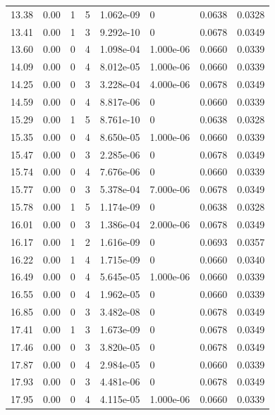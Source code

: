 \documentclass[preview]{standalone}
\begin{document}
{{{\begin{tabular}{L{1.2cm}C{1.2cm} C{0.3cm}C{0.5cm} C{1.4cm}C{1.4cm} C{1.4cm}C{1.4cm}}
  13.38  &  0.00  & 1     &  5 &  1.062e-09  & 0  & 0.0638 &  0.0328   \\ 
  13.41  &  0.00  & 1     &  3 &  9.292e-10  & 0  & 0.0678 &  0.0349   \\ 
  13.60  &  0.00  & 0     &  4 &  1.098e-04  & 1.000e-06  & 0.0660 &  0.0339   \\ 
  14.09  &  0.00  & 0     &  4 &  8.012e-05  & 1.000e-06  & 0.0660 &  0.0339   \\ 
  14.25  &  0.00  & 0     &  3 &  3.228e-04  & 4.000e-06  & 0.0678 &  0.0349   \\ 
  14.59  &  0.00  & 0     &  4 &  8.817e-06  & 0  & 0.0660 &  0.0339   \\ 
  15.29  &  0.00  & 1     &  5 &  8.761e-10  & 0  & 0.0638 &  0.0328   \\ 
  15.35  &  0.00  & 0     &  4 &  8.650e-05  & 1.000e-06  & 0.0660 &  0.0339   \\ 
  15.47  &  0.00  & 0     &  3 &  2.285e-06  & 0  & 0.0678 &  0.0349   \\ 
  15.74  &  0.00  & 0     &  4 &  7.676e-06  & 0  & 0.0660 &  0.0339   \\ 
  15.77  &  0.00  & 0     &  3 &  5.378e-04  & 7.000e-06  & 0.0678 &  0.0349   \\ 
  15.78  &  0.00  & 1     &  5 &  1.174e-09  & 0  & 0.0638 &  0.0328   \\ 
  16.01  &  0.00  & 0     &  3 &  1.386e-04  & 2.000e-06  & 0.0678 &  0.0349   \\ 
  16.17  &  0.00  & 1     &  2 &  1.616e-09  & 0  & 0.0693 &  0.0357   \\ 
  16.22  &  0.00  & 1     &  4 &  1.715e-09  & 0  & 0.0660 &  0.0340   \\ 
  16.49  &  0.00  & 0     &  4 &  5.645e-05  & 1.000e-06  & 0.0660 &  0.0339   \\ 
  16.55  &  0.00  & 0     &  4 &  1.962e-05  & 0  & 0.0660 &  0.0339   \\ 
  16.85  &  0.00  & 0     &  3 &  3.482e-08  & 0  & 0.0678 &  0.0349   \\ 
  17.41  &  0.00  & 1     &  3 &  1.673e-09  & 0  & 0.0678 &  0.0349   \\ 
  17.46  &  0.00  & 0     &  3 &  3.820e-05  & 0  & 0.0678 &  0.0349   \\ 
  17.87  &  0.00  & 0     &  4 &  2.984e-05  & 0  & 0.0660 &  0.0339   \\ 
  17.93  &  0.00  & 0     &  3 &  4.481e-06  & 0  & 0.0678 &  0.0349   \\ 
  17.95  &  0.00  & 0     &  4 &  4.115e-05  & 1.000e-06  & 0.0660 &  0.0339   \\ 

\end{tabular}}}}
\end{document}
